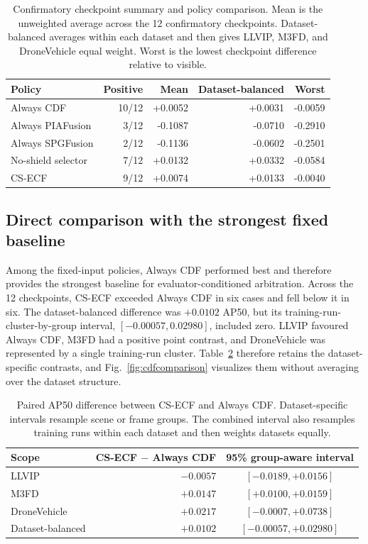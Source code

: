 \documentclass[preprint,11pt]{elsarticle}
\begin{document}
\begin{table}[t]
\centering
\small
\caption{Confirmatory checkpoint summary and policy comparison. Mean is the
unweighted average across the 12 confirmatory checkpoints. Dataset-balanced
averages within each dataset and then gives LLVIP, M3FD, and DroneVehicle equal
weight. Worst is the lowest checkpoint difference relative to visible.}
\label{tab:policy}
\begin{tabular}{@{}lrrrr@{}}
\toprule
Policy & Positive & Mean & Dataset-balanced & Worst \\
\midrule
Always CDF & 10/12 & +0.0052 & +0.0031 & -0.0059 \\
Always PIAFusion & 3/12 & -0.1087 & -0.0710 & -0.2910 \\
Always SPGFusion & 2/12 & -0.1136 & -0.0602 & -0.2501 \\
No-shield selector & 7/12 & +0.0132 & +0.0332 & -0.0584 \\
CS-ECF & 9/12 & +0.0074 & +0.0133 & -0.0040 \\
\bottomrule
\end{tabular}
\end{table}

\subsection{Direct comparison with the strongest fixed baseline}

Among the fixed-input policies, Always CDF performed best and therefore
provides the strongest baseline for evaluator-conditioned arbitration. Across
the 12 checkpoints, CS-ECF exceeded Always CDF in six cases and fell below it in
six. The dataset-balanced difference was \(+0.0102\) AP50, but its
training-run-cluster-by-group interval, \([-0.00057,0.02980]\), included zero.
LLVIP favoured Always CDF, M3FD had a positive point contrast, and DroneVehicle
was represented by a single training-run cluster. Table~\ref{tab:cdf-paired}
therefore retains the dataset-specific contrasts, and
Fig.~\ref{fig:cdfcomparison} visualizes them without averaging over the dataset
structure.

\begin{table}[t]
\centering
\small
\caption{Paired AP50 difference between CS-ECF and Always CDF. Dataset-specific
intervals resample scene or frame groups. The combined interval also resamples
training runs within each dataset and then weights datasets equally.}
\label{tab:cdf-paired}
\begin{tabular}{@{}lrc@{}}
\toprule
Scope & CS-ECF \(-\) Always CDF & 95\% group-aware interval \\
\midrule
LLVIP & \(-0.0057\) & \([-0.0189,+0.0156]\) \\
M3FD & \(+0.0147\) & \([+0.0100,+0.0159]\) \\
DroneVehicle & \(+0.0217\) & \([-0.0007,+0.0738]\) \\
Dataset-balanced & \(+0.0102\) & \([-0.00057,+0.02980]\) \\
\bottomrule
\end{tabular}
\end{table}
\end{document}

